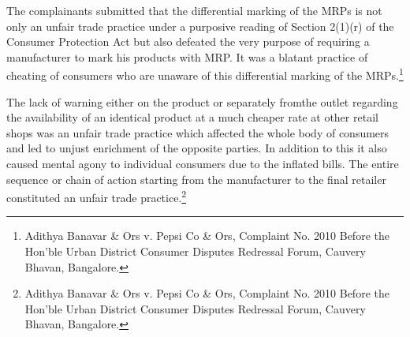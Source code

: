 \begin{multicols}{2}
\vspace{-.15cm}

\noi
The complainants submitted that the differential marking of the MRPs is not only an unfair
trade practice under a purposive reading of Section 2(1)(r) of the Consumer Protection Act but
also defeated the very purpose of requiring a manufacturer to mark his products with MRP. It
was a blatant practice of cheating of consumers who are unaware of this differential marking
of the MRPs.\footnote{Adithya Banavar \& Ors v. Pepsi Co \& Ors, Complaint No. 2010 Before the Hon’ble Urban District Consumer Disputes Redressal Forum, Cauvery Bhavan, Bangalore.}

\vspace{-.15cm}

\noi
The lack of warning either on the product or separately fromthe outlet regarding the availability
of an identical product at a much cheaper rate at other retail shops was an unfair trade practice
which affected the whole body of consumers and led to unjust enrichment of the opposite
parties. In addition to this it also caused mental agony to individual consumers due to the
inflated bills. The entire sequence or chain of action starting from the manufacturer to the final
retailer constituted an unfair trade practice.\footnote{Adithya Banavar \& Ors v. Pepsi Co \& Ors, Complaint No. 2010 Before the Hon’ble Urban District Consumer Disputes Redressal Forum, Cauvery Bhavan, Bangalore.}

\vspace{-.15cm}


\end{multicols}
